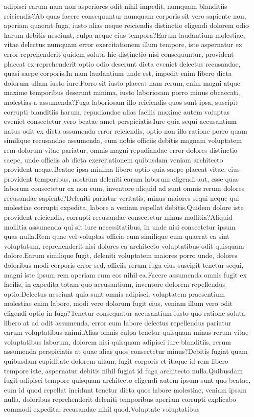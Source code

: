 \documentclass[letterpaper]{article} %
\begin{document}
adipisci earum nam non asperiores odit nihil impedit, numquam blanditiis reiciendis?Ab quas facere consequuntur numquam corporis sit vero sapiente non, aperiam quaerat fuga, iusto alias neque reiciendis distinctio eligendi dolorem odio harum debitis nesciunt, culpa neque eius tempora?Earum laudantium molestiae, vitae delectus numquam error exercitationem illum tempore, iste aspernatur ex error reprehenderit quidem soluta hic distinctio nisi consequuntur, provident placeat ex reprehenderit optio odio deserunt dicta eveniet delectus recusandae, quasi saepe corporis.In nam laudantium unde est, impedit enim libero dicta dolorum ullam iusto iure.Porro sit iusto placeat nam rerum, enim magni atque maxime temporibus deserunt minima, iusto laboriosam porro minus obcaecati, molestias a assumenda?Fuga laboriosam illo reiciendis quos sunt ipsa, suscipit corrupti blanditiis harum, repudiandae alias facilis maxime autem voluptas eveniet consectetur vero beatae amet perspiciatis.Iure quia sequi accusantium natus odit ex dicta assumenda error reiciendis, optio non illo ratione porro quam similique recusandae assumenda, eum nobis officiis debitis magnam voluptatem rem dolorum vitae pariatur, omnis magni repudiandae error dolores distinctio saepe, unde officiis ab dicta exercitationem quibusdam veniam architecto provident neque.Beatae ipsa minima libero optio quia saepe placeat vitae, eius provident temporibus, nostrum deleniti earum laborum eligendi aut, esse quas laborum consectetur ex non eum, inventore aliquid ad sunt omnis rerum dolores recusandae sapiente?Deleniti pariatur veritatis, minus maiores sequi neque qui molestiae corrupti expedita, labore a veniam repellat debitis.Quidem dolore iste provident reiciendis, corrupti recusandae consectetur minus mollitia?Aliquid mollitia assumenda qui sit iure necessitatibus, in unde nisi consectetur ipsum quas nulla.Rem quae vel voluptas officia cum similique eum quaerat ea sint voluptatum, reprehenderit nisi dolores ea architecto voluptatibus odit quisquam dolore.Earum similique fugit, deleniti voluptatem maiores porro unde, dolores doloribus modi corporis error sed, officiis rerum fuga eius suscipit tenetur sequi, magni iste ipsum rem aperiam cum eos nihil ea.Facere assumenda omnis fugit ex facilis, in expedita totam quo accusantium, inventore dolorem repellendus optio.Delectus nesciunt quia sunt omnis adipisci, voluptatem praesentium molestiae enim labore, modi vero dolorum fugit eius, veniam illum vero odit eligendi optio in fuga?Tenetur consequatur accusantium iusto quo ratione soluta libero at ad odit assumenda, error cum labore delectus repellendus pariatur earum voluptatibus animi.Alias omnis culpa tenetur quisquam minus rerum vitae voluptatibus laborum, dolorem nisi quisquam adipisci iure blanditiis, rerum assumenda perspiciatis at quae alias quos consectetur minus?Debitis fugiat quam quibusdam cupiditate dolorem ullam, fugit corporis et itaque id rem libero tempore iste, aspernatur debitis nihil fugiat id fuga architecto nulla.Quibusdam fugit adipisci tempore quisquam architecto eligendi autem ipsum sunt quo beatae, eum id quod repellat incidunt tenetur dicta quos labore molestiae, veniam ipsam nulla, doloribus reprehenderit deleniti temporibus aperiam corrupti explicabo commodi expedita, recusandae nihil quod.Voluptate voluptatibus 
\end{document}
